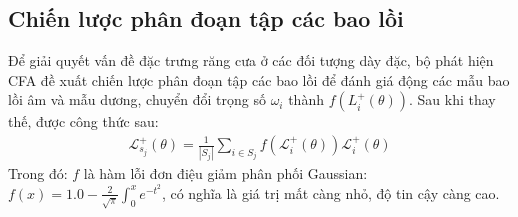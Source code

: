 \documentclass[12pt,a4paper,openany,oneside]{report}
\begin{document}
\subsection{Chiến lược phân đoạn tập các bao lồi}
Để giải quyết vấn đề đặc trưng răng cưa ở các đối tượng dày đặc, bộ phát hiện CFA đề xuất chiến lược phân đoạn tập các bao lồi để đánh giá động các mẫu bao lồi âm và mẫu dương, chuyển đổi trọng số $\omega_i$ thành $f\left(L_i^{+}(\theta)\right)$. Sau khi thay thế, được công thức sau:
\begin{align} \label{loss_positive_convert}
	\mathcal{L}_{s_j}^{+}(\theta)=\frac{1}{\left|S_j\right|} \sum_{i \in S_j} f\left(\mathcal{L}_i^{+}(\theta)\right) \mathcal{L}_i^{+}(\theta)
\end{align}
Trong đó: $f$ là hàm lỗi đơn điệu giảm phân phối Gaussian: $f\left(x\right) = 1.0 - \frac{2}{\sqrt{\pi}}\int_0^xe^{-t^2}$, có nghĩa là giá trị mất càng nhỏ, độ tin cậy càng cao.
\end{document}
